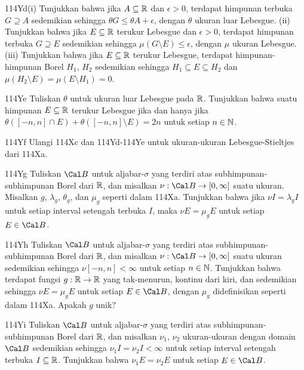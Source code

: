 {\spheader 114Yd(i) Tunjukkan bahwa jika $A\subseteq\Bbb R$ dan
$\epsilon>0$, terdapat himpunan terbuka $G\supseteq A$ sedemikian
sehingga $\theta G\le\theta A+\epsilon$, dengan $\theta$ ukuran luar
Lebesgue. (ii) Tunjukkan bahwa jika $E\subseteq\Bbb R$ terukur Lebesgue
dan $\epsilon>0$, terdapat himpunan terbuka $G\supseteq E$ sedemikian
sehingga $\mu(G\setminus E)\le\epsilon$, dengan $\mu$ ukuran Lebesgue.
 (iii) Tunjukkan bahwa
jika $E\subseteq\Bbb R$ terukur Lebesgue, terdapat himpunan-himpunan
Borel $H_1$, $H_2$ sedemikian sehingga $H_1\subseteq E\subseteq H_2$
dan $\mu(H_2\setminus E)=\mu(E\setminus H_1)=0$.

\spheader 114Ye Tuliskan $\theta$ untuk ukuran luar Lebesgue pada
$\Bbb R$. Tunjukkan bahwa suatu himpunan $E\subseteq\Bbb R$ terukur
Lebesgue jika dan hanya jika
$\theta([-n,n]\cap E)+\theta([-n,n]\setminus E)=2n$ untuk setiap
$n\in\Bbb N$. 

\spheader 114Yf Ulangi 114Xc dan 114Yd-114Ye untuk ukuran-ukuran
Lebesgue-Stieltjes dari 114Xa.

\spheader 114Yg Tuliskan $\Cal B$ untuk aljabar-$\sigma$ yang terdiri
atas subhimpunan-subhimpunan Borel dari $\Bbb R$, dan misalkan
$\nu:\Cal B\to[0,\infty]$ suatu ukuran. Misalkan
$g$, $\lambda_g$, $\theta_g$, dan $\mu_g$ seperti dalam 114Xa.
Tunjukkan bahwa jika $\nu I=\lambda_gI$ untuk setiap interval setengah
terbuka $I$, maka $\nu E=\mu_gE$ untuk setiap $E\in\Cal B$.

\spheader 114Yh Tuliskan $\Cal B$ untuk aljabar-$\sigma$ yang terdiri
atas subhimpunan-subhimpunan Borel dari $\Bbb R$, dan misalkan
$\nu:\Cal B\to[0,\infty]$ suatu ukuran sedemikian sehingga
$\nu[-n,n]<\infty$ untuk setiap $n\in\Bbb N$. Tunjukkan bahwa terdapat
fungsi $g:\Bbb R\to\Bbb R$ yang tak-menurun, kontinu dari kiri, dan
sedemikian sehingga $\nu E=\mu_gE$ untuk setiap $E\in\Cal B$, dengan
$\mu_g$ didefinisikan seperti dalam 114Xa. Apakah $g$ unik?

\spheader 114Yi Tuliskan $\Cal B$ untuk aljabar-$\sigma$ yang terdiri
atas subhimpunan-subhimpunan Borel dari $\Bbb R$, dan misalkan $\nu_1$, $\nu_2$
ukuran-ukuran dengan domain $\Cal B$ sedemikian sehingga
$\nu_1 I=\nu_2I<\infty$ untuk setiap interval setengah terbuka
$I\subseteq\Bbb R$. Tunjukkan bahwa $\nu_1E=\nu_2E$ untuk setiap
$E\in\Cal B$.

}
